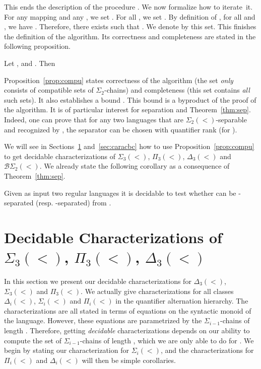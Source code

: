 \documentclass[envcountsame]{llncs}
\newcommand{\dew}[1]{\ensuremath{\Delta_{#1}(<)}\xspace}
\newcommand{\sic}[1]{\ensuremath{\Sigma_{#1}}\xspace}
\newcommand{\siw}[1]{\ensuremath{\Sigma_{#1}(<)}\xspace}
\newcommand{\piw}[1]{\ensuremath{\Pi_{#1}(<)}\xspace}
\newcommand{\siwd}{\ensuremath{\Sigma_{2}(<)}\xspace}
\newcommand{\bswd}{\ensuremath{\mathcal{B}\Sigma_{2}(<)}\xspace}
\newcommand{\dewt}{\ensuremath{\Delta_{3}(<)}\xspace}
\newcommand{\siwt}{\ensuremath{\Sigma_{3}(<)}\xspace}
\newcommand{\piwt}{\ensuremath{\Pi_{3}(<)}\xspace}
\newcommand\qchains[1]{\ensuremath{\sic{#1}}-chains\xspace}
\newcommand\dchains{\qchains{2}}
\begin{document}
This ends the description of the procedure .
We now formalize how to iterate~it. For any mapping  and any  ,
we set . For all , we set
. By
definition of , for all  and , we have
. Therefore, there exists  such that . We denote by  this set. This
finishes the definition of the algorithm. Its correctness 
and completeness are stated in the following proposition. 

\begin{proposition} \label{prop:compu}
  Let ,  and . Then 
\end{proposition} 
\noindent
Proposition~\ref{prop:compu} states correctness of the algorithm (the set
 \emph{only} consists of
compatible sets of \dchains) and completeness (this set contains \emph{all}
such sets). It also establishes a bound . This bound is a byproduct of
the proof of the algorithm. It is of particular interest for separation and
Theorem~\ref{thm:sep}. Indeed, one can prove that for any two languages that are
\siwd-separable and recognized by , the separator can be chosen with
quantifier rank  (for ).

We will see in Sections~\ref{sec:caracsi} and~\ref{sec:caracbc} how to use Proposition~\ref{prop:compu}
to get decidable characterizations of \siwt, \piwt, \dewt and  \bswd. We
already state the following corollary as a consequence of
Theorem~\ref{thm:sep}.

\begin{corollary} \label{cor:decidsep}
  Given as input two regular languages  it is decidable to test
  whether  can be -separated
  (resp. -separated) from .
\end{corollary}

\section{Decidable Characterizations of \siwt, \piwt, \dewt}
\label{sec:caracsi}
In this section we present our decidable characterizations for \dewt,
\siwt and \piwt. We actually give characterizations for all classes
\dew{i}, \siw{i} and \piw{i} in the quantifier alternation hierarchy.
The characterizations are all stated in terms of equations on
the syntactic monoid of the language. However, these equations are
parametrized by the \qchains{i-1} of length . Therefore, getting
\emph{decidable} characterizations depends on our ability to compute the set
of \qchains{i-1} of length , which we are only able to do for
.  We begin by stating
our characterization for \siw{i}, and the characterizations for \piw{i}
and \dew{i} will then be simple corollaries.
\end{document}
